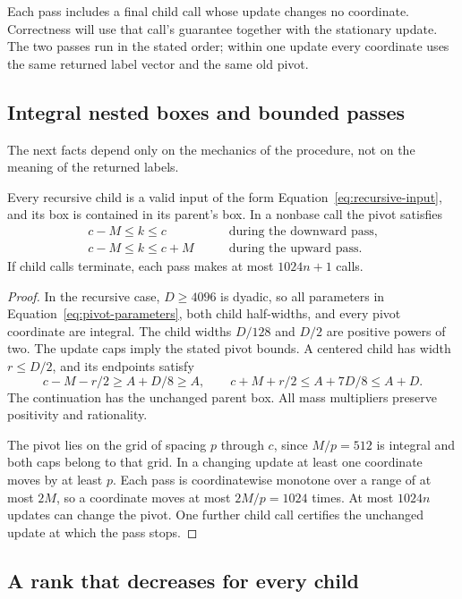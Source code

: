 Each pass includes a final child call whose update changes no
coordinate. Correctness will use that call's guarantee together with
the stationary update. The two passes run in the stated order;
within one update every coordinate uses the same returned label vector
and the same old pivot.

\subsection{Integral nested boxes and bounded passes}

The next facts depend only on the mechanics of the procedure, not on
the meaning of the returned labels.

\begin{lemma}
\label{lem:well-formed}
Every recursive child is a valid input of the form
Equation~\eqref{eq:recursive-input}, and its box is contained in
its parent's box. In a nonbase call the pivot satisfies
\[
 \begin{aligned}
 c-M\le k\le c&\qquad\text{during the downward pass},\\
 c-M\le k\le c+M&\qquad\text{during the upward pass}.
 \end{aligned}
\]
If child calls terminate, each pass makes at most $1024n+1$ calls.
\end{lemma}

\begin{proof}
In the recursive case, $D\ge4096$ is dyadic, so all parameters
in Equation~\eqref{eq:pivot-parameters}, both child half-widths,
and every pivot coordinate are integral. The child widths $D/128$
and $D/2$ are positive powers of two. The update caps imply the
stated pivot bounds. A centered child has width $r\le D/2$,
and its endpoints satisfy
\[
 c-M-r/2\ge A+D/8\ge A,
 \qquad c+M+r/2\le A+7D/8\le A+D.
\]
The continuation has the unchanged parent box. All mass multipliers
preserve positivity and rationality.

The pivot lies on the grid of spacing $p$ through $c$, since
$M/p=512$ is integral and both caps belong to that grid. In a
changing update at least one coordinate moves by at least $p$.
Each pass is coordinatewise monotone over a range of at most $2M$,
so a coordinate moves at most $2M/p=1024$ times. At most $1024n$
updates can change the pivot. One further child call certifies the
unchanged update at which the pass stops.
\end{proof}

\subsection{A rank that decreases for every child}

